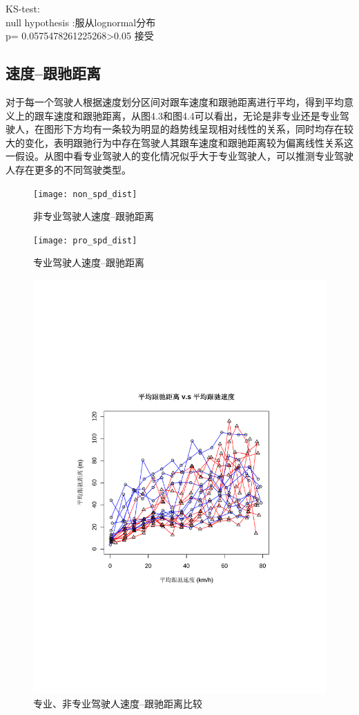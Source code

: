 KS-test:\\
null hypothesis :服从lognormal分布\\
p= 0.0575478261225268>0.05 接受\\

\subsection{速度--跟驰距离}
对于每一个驾驶人根据速度划分区间对跟车速度和跟驰距离进行平均，得到平均意义上的跟车速度和跟驰距离，从图4.3和图4.4可以看出，无论是非专业还是专业驾驶人，在图形下方均有一条较为明显的趋势线呈现相对线性的关系，同时均存在较大的变化，表明跟驰行为中存在驾驶人其跟车速度和跟驰距离较为偏离线性关系这一假设。从图中看专业驾驶人的变化情况似乎大于专业驾驶人，可以推测专业驾驶人存在更多的不同驾驶类型。
\begin{figure}[htpb]
	\centering
	\label{spd_dist:nonpro}
	\texttt{[image: non\_spd\_dist]}
	\caption{非专业驾驶人速度--跟驰距离}
\end{figure}



\begin{figure}[htpb]
	\centering
	\label{spd_dist:pro}
	\texttt{[image: pro\_spd\_dist]}
	\caption{专业驾驶人速度--跟驰距离}
\end{figure}

\begin{figure}[htpb]
	\centering
	\label{spd_dist:all}
	\includegraphics[totalheight=10cm]{all_spd_dist}
	\caption{专业、非专业驾驶人速度--跟驰距离比较}
\end{figure}



